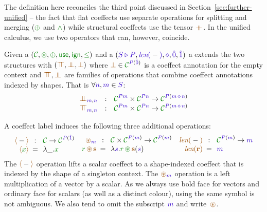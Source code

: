 The definition here reconciles the third point discussed in Section~\ref{sec:further-unified} --
the fact that flat coeffects use separate operations for splitting and merging ($\cpar$ and $\czip$)
while structural coeffects use the tensor $\atimes$. In the unified calculus, we use two operators
that can, however, coincide.

\begin{definition}
\label{def:unified-alg}
Given a  $(\C, \cseq, \cpar, \cunit, \czero, \cleq)$ and a
 $(\SHP, \slen{-}, \stimes, \sempty, \sunit)$ a  extends the two structures with $(\azip, \apar, \azero)$ where $\azero \in \C^{\SP(\sempty)}$
is a coeffect annotation for the empty context and $\azip, \apar$ are families of operations that
combine coeffect annotations indexed by shapes. That is $\forall \sclrd{n},\sclrd{m} \in \SH$:
%
\begin{equation*}
\begin{array}{rcl}
\apar_{\sclrd{m},\sclrd{n}} &:& \C^{\SP \sclrd{m}} \times \C^{\SP \sclrd{n}} \rightarrow \C^{\SP (\sclrd{m}\,\stimes\,\sclrd{n})} \\
\azip_{\sclrd{m},\sclrd{n}} &:& \C^{\SP \sclrd{m}} \times \C^{\SP \sclrd{n}} \rightarrow \C^{\SP (\sclrd{m}\,\stimes\,\sclrd{n})}
\end{array}
\end{equation*}
\end{definition}

\noindent
A coeffect label induces the following three additional operations:
%
\begin{equation*}
\begin{array}{rclcrcl}
 \alift{-} &\narrow{:}& \C \rightarrow \C^{\SP(\sunit)}  \\
 \alift{\cclrd{x}} &\narrow{=}& \lambda \_ . \cclrd{x}   \\
\end{array}
\begin{array}{rclcrcl}
 \aseq_{\sclrd{m}} &\narrow{:}&  \C \times \C^{\SP(\sclrd{m})} \rightarrow \C^{\SP(\sclrd{m})}   \\
 \cclrd{r}\, \aseq\, \aclrd{\textbf{s}} &\narrow{=}& \lambda \sclrd{s} . \cclrd{r}\, \cseq\, \aclrd{\textbf{s}}(\sclrd{s}) \\
\end{array}
\begin{array}{rclcrcl}
 \alen{-} &\narrow{:}& \C^{\SP(\sclrd{m})} \rightarrow \sclrd{m}\\
 \alen{\aclrd{\textbf{r}}} &\narrow{=}& \sclrd{m}
\end{array}
\end{equation*}
%
The $\alift{-}$ operation lifts a scalar coeffect to a shape-indexed coeffect that is indexed by
the shape of a singleton context. The $\aseq_{\sclrd{m}}$ operation is a left multiplication of a
vector by a scalar. As we always use bold face for vectors and ordinary face for scalars (as well
as a distinct colour), using the same symbol is not ambiguous. We also tend to omit the subscript
$\sclrd{m}$ and write~$\aseq$.

